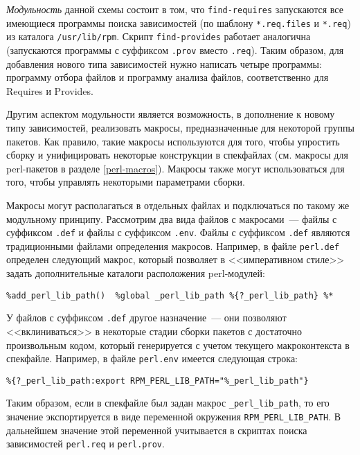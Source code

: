 \documentclass[russian,a4paper,12pt,titlepage]{article}
\begin{document}
\textit{Модульность}\label{modular-approach} данной схемы состоит в том,
что \verb|find-requires| запускаются все имеющиеся программы поиска зависимостей
(по шаблону \verb|*.req.files| и \verb|*.req|) из каталога \verb|/usr/lib/rpm|.  Скрипт \verb|find-provides| работает аналогична
(запускаются программы с суффиксом \verb|.prov| вместо \verb|.req|).  Таким образом, для добавления нового типа зависимостей
нужно написать четыре программы: программу отбора файлов и программу анализа файлов, соответственно для Requires и Provides.

Другим аспектом модульности является возможность, в дополнение к новому типу зависимостей, реализовать макросы,
предназначенные для некоторой группы пакетов.  Как правило, такие макросы используются для того, чтобы упростить
сборку и унифицировать некоторые конструкции в спекфайлах (см. макросы для perl-пакетов в разделе \ref{perl-macros}).
Макросы также могут использоваться для того, чтобы управлять некоторыми параметрами сборки.

Макросы могут располагаться в отдельных файлах и подключаться по такому же модульному принципу.
Рассмотрим два вида файлов с макросами~--- файлы с суффиксом \verb|.def| и файлы с суффиксом \verb|.env|.
Файлы с суффиксом \verb|.def|\label{def-macro-files} являются традиционными файлами определения макросов.  Например,
в файле \verb|perl.def| определен следующий макрос, который позволяет в <<императивном стиле>> задать дополнительные
каталоги расположения perl-модулей:
\begin{verbatim}
%add_perl_lib_path()  %global _perl_lib_path %{?_perl_lib_path} %*
\end{verbatim}

У файлов с суффиксом \verb|.def| другое назначение~--- они позволяют <<вклиниваться>> в некоторые стадии сборки пакетов
с достаточно произвольным кодом, который генерируется с учетом текущего макроконтекста в спекфайле.
Например, в файле \verb|perl.env|\label{perl-env-intro} имеется следующая строка:
\begin{verbatim}
%{?_perl_lib_path:export RPM_PERL_LIB_PATH="%_perl_lib_path"}
\end{verbatim}
Таким образом, если в спекфайле был задан макрос \verb|_perl_lib_path|, то его значение экспортируется
в виде переменной окружения \verb|RPM_PERL_LIB_PATH|.  В дальнейшем значение этой переменной учитывается
в скриптах поиска зависимостей \verb|perl.req| и \verb|perl.prov|.
\end{document}
